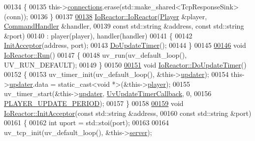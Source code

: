 \begin{DoxyCode}
00134 \{
00135     this->\hyperlink{classIoReactor_a15617cf44d3c50d5c2d31e8b1812e140}{connections}.erase(std::make\_shared<TcpResponseSink>(conn));
00136 \}
00137 
\hypertarget{io__reactor_8cpp_source_l00138}{}\hyperlink{classIoReactor_aace954427c447c73caf6b8dbcd367284}{00138} \hyperlink{classIoReactor_aace954427c447c73caf6b8dbcd367284}{IoReactor::IoReactor}(\hyperlink{classPlayer}{Player} &player, \hyperlink{classCommandHandler}{CommandHandler} &handler,
00139                      \textcolor{keyword}{const} std::string &address, \textcolor{keyword}{const} std::string &port)
00140     : player(player), handler(handler)
00141 \{
00142     \hyperlink{classIoReactor_aab8269bf4512c4c74a56998898b3144e}{InitAcceptor}(address, port);
00143     \hyperlink{classIoReactor_a8a586b8e9545e79db8dc9bca3657388f}{DoUpdateTimer}();
00144 \}
00145 
\hypertarget{io__reactor_8cpp_source_l00146}{}\hyperlink{classIoReactor_a23f583f9964a6f3f38f983b40f7ae10d}{00146} \textcolor{keywordtype}{void} \hyperlink{classIoReactor_a23f583f9964a6f3f38f983b40f7ae10d}{IoReactor::Run}()
00147 \{
00148     uv\_run(uv\_default\_loop(), UV\_RUN\_DEFAULT);
00149 \}
00150 
\hypertarget{io__reactor_8cpp_source_l00151}{}\hyperlink{classIoReactor_a8a586b8e9545e79db8dc9bca3657388f}{00151} \textcolor{keywordtype}{void} \hyperlink{classIoReactor_a8a586b8e9545e79db8dc9bca3657388f}{IoReactor::DoUpdateTimer}()
00152 \{
00153     uv\_timer\_init(uv\_default\_loop(), &this->\hyperlink{classIoReactor_a6364acb721e4a7a1374070e317074bbc}{updater});
00154     this->\hyperlink{classIoReactor_a6364acb721e4a7a1374070e317074bbc}{updater}.data = \textcolor{keyword}{static\_cast<}\textcolor{keywordtype}{void} *\textcolor{keyword}{>}(&this->\hyperlink{classIoReactor_a795397b36da55b59bff63b455a344dea}{player});
00155     uv\_timer\_start(&this->\hyperlink{classIoReactor_a6364acb721e4a7a1374070e317074bbc}{updater}, \hyperlink{io__reactor_8cpp_a4bdadddb08a579d655018f6fa0ac908e}{UvUpdateTimerCallback}, 0,
00156                    \hyperlink{classIoReactor_a1d8cc56deaa2e801347c21e6490d4f5c}{PLAYER\_UPDATE\_PERIOD});
00157 \}
00158 
\hypertarget{io__reactor_8cpp_source_l00159}{}\hyperlink{classIoReactor_aab8269bf4512c4c74a56998898b3144e}{00159} \textcolor{keywordtype}{void} \hyperlink{classIoReactor_aab8269bf4512c4c74a56998898b3144e}{IoReactor::InitAcceptor}(\textcolor{keyword}{const} std::string &address,
00160                              \textcolor{keyword}{const} std::string &port)
00161 \{
00162     \textcolor{keywordtype}{int} uport = std::stoi(port);
00163 
00164     uv\_tcp\_init(uv\_default\_loop(), &this->\hyperlink{classIoReactor_a4c9c61af246fda7db1bdd4e2b3170c66}{server});

\end{DoxyCode}
